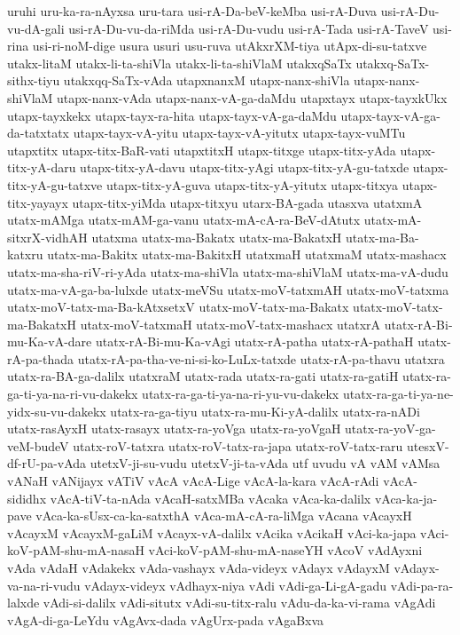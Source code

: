 {uruhi
uru-ka-ra-nAyxsa
uru-tara
usi-rA-Da-beV-keMba
usi-rA-Duva
usi-rA-Du-vu-dA-gali
usi-rA-Du-vu-da-riMda
usi-rA-Du-vudu
usi-rA-Tada
usi-rA-TaveV
usi-rina
usi-ri-noM-dige
usura
usuri
usu-ruva
utAkxrXM-tiya
utApx-di-su-tatxve
utakx-litaM
utakx-li-ta-shiVla
utakx-li-ta-shiVlaM
utakxqSaTx
utakxq-SaTx-sithx-tiyu
utakxqq-SaTx-vAda
utapxnanxM
utapx-nanx-shiVla
utapx-nanx-shiVlaM
utapx-nanx-vAda
utapx-nanx-vA-ga-daMdu
utapxtayx
utapx-tayxkUkx
utapx-tayxkekx
utapx-tayx-ra-hita
utapx-tayx-vA-ga-daMdu
utapx-tayx-vA-ga-da-tatxtatx
utapx-tayx-vA-yitu
utapx-tayx-vA-yitutx
utapx-tayx-vuMTu
utapxtitx
utapx-titx-BaR-vati
utapxtitxH
utapx-titxge
utapx-titx-yAda
utapx-titx-yA-daru
utapx-titx-yA-davu
utapx-titx-yAgi
utapx-titx-yA-gu-tatxde
utapx-titx-yA-gu-tatxve
utapx-titx-yA-guva
utapx-titx-yA-yitutx
utapx-titxya
utapx-titx-yayayx
utapx-titx-yiMda
utapx-titxyu
utarx-BA-gada
utasxva
utatxmA
utatx-mAMga
utatx-mAM-ga-vanu
utatx-mA-cA-ra-BeV-dAtutx
utatx-mA-sitxrX-vidhAH
utatxma
utatx-ma-Bakatx
utatx-ma-BakatxH
utatx-ma-Ba-katxru
utatx-ma-Bakitx
utatx-ma-BakitxH
utatxmaH
utatxmaM
utatx-mashacx
utatx-ma-sha-riV-ri-yAda
utatx-ma-shiVla
utatx-ma-shiVlaM
utatx-ma-vA-dudu
utatx-ma-vA-ga-ba-lulxde
utatx-meVSu
utatx-moV-tatxmAH
utatx-moV-tatxma
utatx-moV-tatx-ma-Ba-kAtxsetxV
utatx-moV-tatx-ma-Bakatx
utatx-moV-tatx-ma-BakatxH
utatx-moV-tatxmaH
utatx-moV-tatx-mashacx
utatxrA
utatx-rA-Bi-mu-Ka-vA-dare
utatx-rA-Bi-mu-Ka-vAgi
utatx-rA-patha
utatx-rA-pathaH
utatx-rA-pa-thada
utatx-rA-pa-tha-ve-ni-si-ko-LuLx-tatxde
utatx-rA-pa-thavu
utatxra
utatx-ra-BA-ga-dalilx
utatxraM
utatx-rada
utatx-ra-gati
utatx-ra-gatiH
utatx-ra-ga-ti-ya-na-ri-vu-dakekx
utatx-ra-ga-ti-ya-na-ri-yu-vu-dakekx
utatx-ra-ga-ti-ya-ne-yidx-su-vu-dakekx
utatx-ra-ga-tiyu
utatx-ra-mu-Ki-yA-dalilx
utatx-ra-nADi
utatx-rasAyxH
utatx-rasayx
utatx-ra-yoVga
utatx-ra-yoVgaH
utatx-ra-yoV-ga-veM-budeV
utatx-roV-tatxra
utatx-roV-tatx-ra-japa
utatx-roV-tatx-raru
utesxV-df-rU-pa-vAda
utetxV-ji-su-vudu
utetxV-ji-ta-vAda
utf
uvudu
vA
vAM
vAMsa
vANaH
vANijayx
vATiV
vAcA
vAcA-Lige
vAcA-la-kara
vAcA-rAdi
vAcA-sididhx
vAcA-tiV-ta-nAda
vAcaH-satxMBa
vAcaka
vAca-ka-dalilx
vAca-ka-ja-pave
vAca-ka-sUsx-ca-ka-satxthA
vAca-mA-cA-ra-liMga
vAcana
vAcayxH
vAcayxM
vAcayxM-gaLiM
vAcayx-vA-dalilx
vAcika
vAcikaH
vAci-ka-japa
vAci-koV-pAM-shu-mA-nasaH
vAci-koV-pAM-shu-mA-naseYH
vAcoV
vAdAyxni
vAda
vAdaH
vAdakekx
vAda-vashayx
vAda-videyx
vAdayx
vAdayxM
vAdayx-va-na-ri-vudu
vAdayx-videyx
vAdhayx-niya
vAdi
vAdi-ga-Li-gA-gadu
vAdi-pa-ra-lalxde
vAdi-si-dalilx
vAdi-situtx
vAdi-su-titx-ralu
vAdu-da-ka-vi-rama
vAgAdi
vAgA-di-ga-LeYdu
vAgAvx-dada
vAgUrx-pada
vAgaBxva
}

